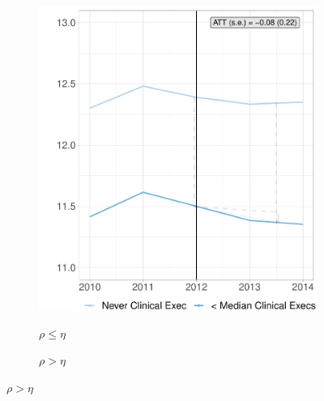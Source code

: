 \documentclass[12pt]{article}
\begin{document}
    \begin{figure}[ht!]
     \caption{Effect of Clinical Training on Mortality Rates, Binned Treatment}
     \centering
     \begin{subfigure}[b]{0.45\textwidth}
         \centering
         \caption{$\rho \leq \eta$}
         \includegraphics[width=\textwidth]{Objects/cont_belowmedmort_md_nomd_synth_graph.pdf}
         \label{fig:belowmed_mort_synth_clinical}
     \end{subfigure}
     \hfill
     \begin{subfigure}[b]{0.45\textwidth}
         \centering
         \caption{$\rho > \eta$}

\end{subfigure}
\end{figure}
\end{document}
